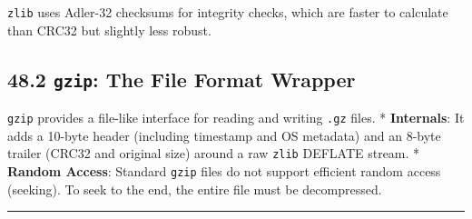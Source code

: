 \passthrough{\lstinline!zlib!} uses Adler-32 checksums for integrity
checks, which are faster to calculate than CRC32 but slightly less
robust.

\hypertarget{gzip-the-file-format-wrapper}{%
\subsection{\texorpdfstring{48.2 \texttt{gzip}: The File Format
Wrapper}{48.2 gzip: The File Format Wrapper}}\label{gzip-the-file-format-wrapper}}

\passthrough{\lstinline!gzip!} provides a file-like interface for
reading and writing \passthrough{\lstinline!.gz!} files. *
\textbf{Internals}: It adds a 10-byte header (including timestamp and OS
metadata) and an 8-byte trailer (CRC32 and original size) around a raw
\passthrough{\lstinline!zlib!} DEFLATE stream. * \textbf{Random Access}:
Standard \passthrough{\lstinline!gzip!} files do not support efficient
random access (seeking). To seek to the end, the entire file must be
decompressed.

\begin{center}\rule{0.5\linewidth}{0.5pt}\end{center}

